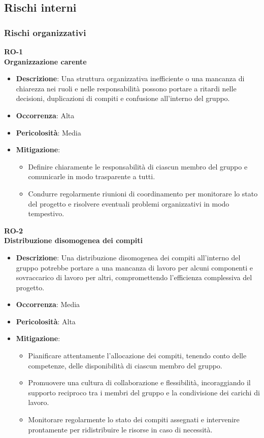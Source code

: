\documentclass[5pt]{article}
\begin{document}
\subsection{Rischi interni}
\subsubsection{Rischi organizzativi}
\textbf{RO-1}\\
\textbf{Organizzazione carente}
\begin{itemize}
  \item \textbf{Descrizione}: Una struttura organizzativa inefficiente o una mancanza di chiarezza nei ruoli e nelle responsabilità possono portare a ritardi nelle decisioni, duplicazioni di compiti e confusione all'interno del gruppo.
  \item \textbf{Occorrenza}: Alta
  \item \textbf{Pericolosità}: Media
  \item \textbf{Mitigazione}: 
    \begin{itemize}
      \item Definire chiaramente le responsabilità di ciascun membro del gruppo e comunicarle in modo trasparente a tutti.
      \item Condurre regolarmente riunioni di coordinamento per monitorare lo stato del progetto e risolvere eventuali problemi organizzativi in modo tempestivo.
    \end{itemize}
\end{itemize}
\textbf{RO-2}\\
\textbf{Distribuzione disomogenea dei compiti}
\begin{itemize}
  \item \textbf{Descrizione}: Una distribuzione disomogenea dei compiti all'interno del gruppo potrebbe portare a una mancanza di lavoro per alcuni componenti e sovraccarico di lavoro per altri, compromettendo l'efficienza complessiva del progetto.
  \item \textbf{Occorrenza}: Media
  \item \textbf{Pericolosità}: Alta
  \item \textbf{Mitigazione}: 
    \begin{itemize}
      \item Pianificare attentamente l'allocazione dei compiti, tenendo conto delle competenze, delle disponibilità di ciascun membro del gruppo.
      \item Promuovere una cultura di collaborazione e flessibilità, incoraggiando il supporto reciproco tra i membri del gruppo e la condivisione dei carichi di lavoro.
      \item Monitorare regolarmente lo stato dei compiti assegnati e intervenire prontamente per ridistribuire le risorse in caso di necessità.
    \end{itemize}
\end{itemize}
\end{document}
